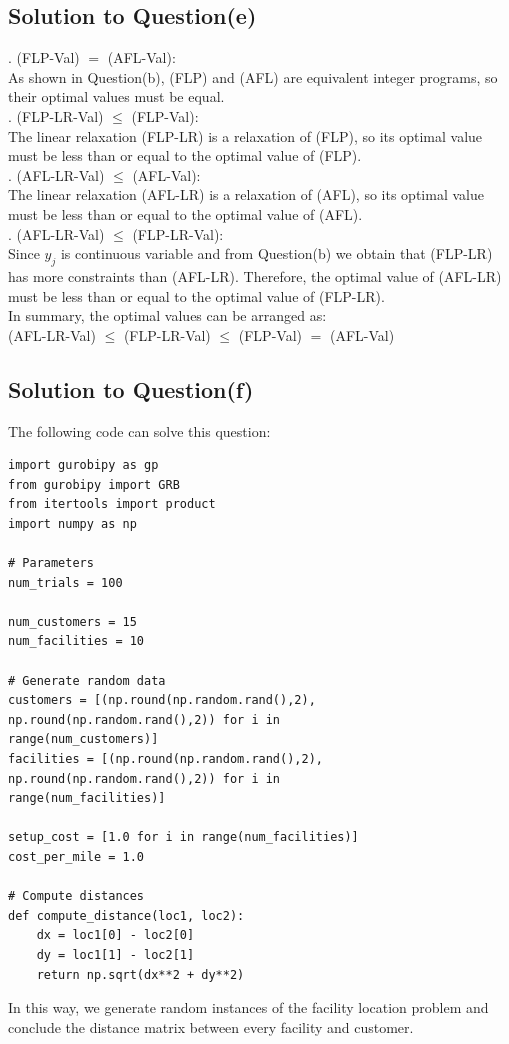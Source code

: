 \documentclass[a4paper]{article}
\begin{document}
\subsection{Solution to Question(e)}
\uppercase\expandafter{}. (FLP-Val) $=$ (AFL-Val): \\
As shown in Question(b), (FLP) and (AFL) are equivalent integer programs, so their optimal values must be equal.\\
\uppercase\expandafter{}. (FLP-LR-Val) $\leq $ (FLP-Val): \\
The linear relaxation (FLP-LR) is a relaxation of (FLP), so its optimal value must be less than or equal to the optimal value of (FLP).\\
\uppercase\expandafter{}. (AFL-LR-Val) $\leq $ (AFL-Val): \\
The linear relaxation (AFL-LR) is a relaxation of (AFL), so its optimal value must be less than or equal to the optimal value of (AFL).\\
\uppercase\expandafter{}. (AFL-LR-Val) $\leq $ (FLP-LR-Val): \\
Since $y_j$ is continuous variable and from Question(b) we obtain that (FLP-LR) has more constraints than (AFL-LR). Therefore, the  optimal value of (AFL-LR) must be less than or equal to the optimal value of (FLP-LR).\\
In summary, the optimal values can be arranged as:\\
(AFL-LR-Val) $\leq $ (FLP-LR-Val) $\leq $  (FLP-Val) $=$ (AFL-Val)

\subsection{Solution to Question(f)}
The following code can solve this question:
\begin{verbatim}
import gurobipy as gp
from gurobipy import GRB
from itertools import product 
import numpy as np

# Parameters
num_trials = 100

num_customers = 15
num_facilities = 10

# Generate random data
customers = [(np.round(np.random.rand(),2), np.round(np.random.rand(),2)) for i in 
range(num_customers)]
facilities = [(np.round(np.random.rand(),2), np.round(np.random.rand(),2)) for i in 
range(num_facilities)]

setup_cost = [1.0 for i in range(num_facilities)]
cost_per_mile = 1.0

# Compute distances
def compute_distance(loc1, loc2):
    dx = loc1[0] - loc2[0]
    dy = loc1[1] - loc2[1]
    return np.sqrt(dx**2 + dy**2)
\end{verbatim}
\cite{FLP}
In this way, we generate random instances of the facility location problem and conclude the distance matrix between every facility and customer.\\
\end{document}
